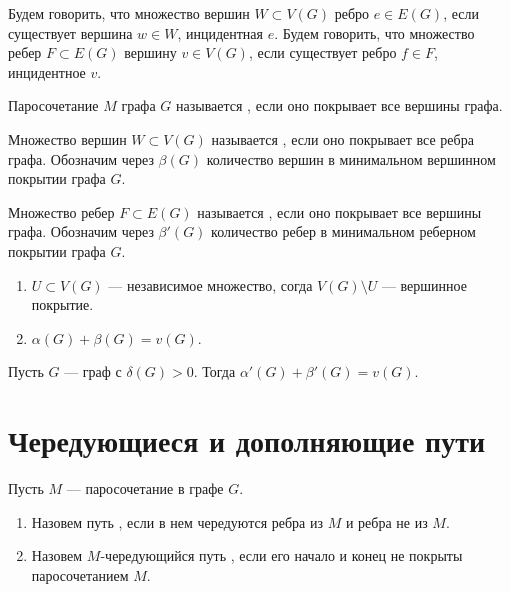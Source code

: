 \begin{definition}[]
	Будем говорить, что множество вершин $W \subset V(G)$  ребро $e \in  E(G)$, если существует вершина $w \in W$, инцидентная $e$. Будем говорить, что множество ребер $F \subset E(G)$  вершину $v \in V(G)$, если существует ребро $f \in  F$, инцидентное $v$.
\end{definition}

\begin{definition}[]
	Паросочетание $M$ графа $G$ называется , если оно покрывает все вершины графа.
\end{definition}

\begin{definition}[]
	Множество вершин $W \subset V(G)$ называется , если оно покрывает все ребра графа. Обозначим через $\beta(G)$ количество вершин в минимальном вершинном покрытии графа $G$.
\end{definition}

\begin{definition}[]
	Множество ребер $F \subset E(G)$ называется , если оно покрывает все вершины графа. Обозначим через $\beta'(G)$ количество ребер в минимальном реберном покрытии графа $G$.
\end{definition}

\begin{lemma}
    \begin{enumerate}
    	\item  $U \subset V(G)$ --- независимое множество, согда $V(G) \setminus U$ --- вершинное покрытие.
		\item $\alpha(G) + \beta(G) = v(G)$.
    \end{enumerate}
\end{lemma}

\begin{theorem}[Галлаи, 1959]
	Пусть $G$ --- граф с $\delta(G)>0$. Тогда $\alpha'(G) + \beta'(G) = v(G)$.
\end{theorem}

\section{Чередующиеся и дополняющие пути}
\begin{definition}[]
	Пусть $M$ --- паросочетание в графе $G$.
	\begin{enumerate}
		\item Назовем путь , если  в нем чередуются ребра из $M$ и ребра не из $M$.
		\item Назовем $M$-чередующийся путь , если его начало и конец не покрыты паросочетанием $M$.
	\end{enumerate}
\end{definition}


